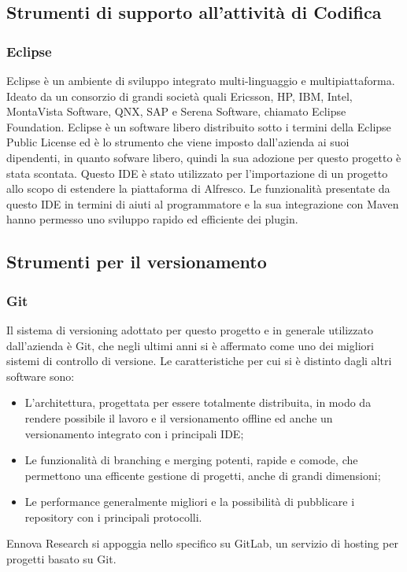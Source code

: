 \subsection{Strumenti di supporto all’attività di Codifica}
\subsubsection{Eclipse}
Eclipse è un ambiente di sviluppo integrato multi-linguaggio e multipiattaforma. Ideato da un consorzio di grandi società quali Ericsson, HP, IBM, Intel, MontaVista Software, QNX, SAP e Serena Software, chiamato Eclipse Foundation.
Eclipse è un software libero distribuito sotto i termini della Eclipse Public License ed è lo strumento che viene imposto dall'azienda ai suoi dipendenti, in quanto sofware libero, quindi la sua adozione per questo progetto è stata scontata.
Questo IDE è stato utilizzato per l’importazione
di un progetto allo scopo di estendere la piattaforma di Alfresco. Le funzionalità
presentate da questo IDE in termini di aiuti al programmatore e la sua integrazione con Maven hanno permesso uno sviluppo rapido ed efficiente dei plugin.
\subsection{Strumenti per il versionamento}
\subsubsection{Git}
Il sistema di versioning adottato per questo progetto e in generale utilizzato dall'azienda è Git, che negli ultimi anni si è affermato come uno
dei migliori sistemi di controllo di versione.
Le caratteristiche per cui si è distinto dagli altri software sono:
\begin{itemize}
\item L’architettura, progettata per essere totalmente distribuita, in modo da
rendere possibile il lavoro e il versionamento offline ed anche un versionamento integrato con i principali IDE;
\item Le funzionalità di branching e merging potenti, rapide e comode, che permettono una efficente gestione di progetti, anche di grandi dimensioni;
\item Le performance generalmente migliori e la possibilità di pubblicare i repository con i principali protocolli.
\end{itemize}
Ennova Research si appoggia nello specifico su GitLab, un servizio di hosting per progetti basato
su Git.

